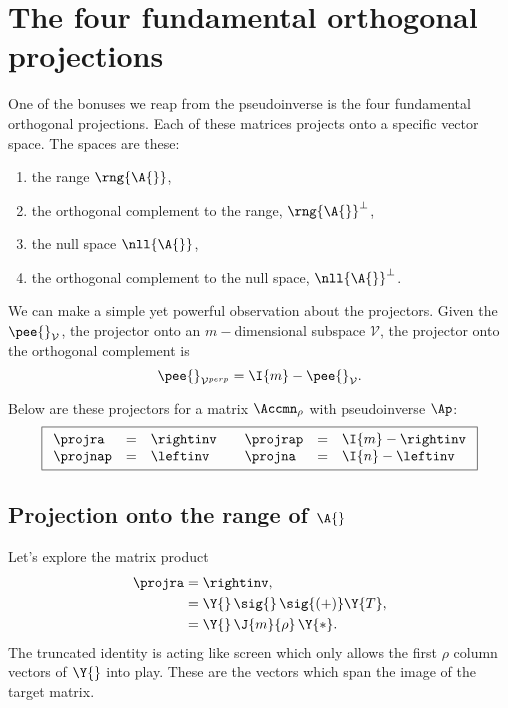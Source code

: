 \section[The fundamental projections]{The four fundamental orthogonal projections}
\label{sec:orthproj}

One of the bonuses we reap from the pseudoinverse is the four fundamental orthogonal projections. Each of these matrices projects onto a specific vector space. The spaces are these:
\begin{enumerate}
\item the range $\rng{\A{}}$,
\item the orthogonal complement to the range, $\rng{\A{}}^{\perp}$,
\item the null space $\nll{\A{}}$,
\item the orthogonal complement to the null space, $\nll{\A{}}^{\perp}$.
\end{enumerate}

We can make a simple yet powerful observation about the projectors.
Given the $\pee{}_{\mathcal{V}}$, the projector onto an $m-$dimensional subspace $\mathcal{V}$, the projector onto the orthogonal complement is
\begin{equation}
  \pee{}_{\mathcal{V}^{perp}} = \I{m}-\pee{}_{\mathcal{V}}.
\end{equation}

Below are these projectors for a matrix $\Accmn_{\rho}$ with pseudoinverse $\Ap$:
\begin{equation}
\boxed{
  \begin{array}{lcllcl}
    \projra& = &\rightinv & \quad \projrap& = &\I{m}-\rightinv\\
    \projnap& =& \leftinv & \quad \projna& = &\I{n}-\leftinv\\    
  \end{array}
  }
  \label{eq:fourprojpi}
\end{equation}

\subsection{Projection onto the range of $\A{}$}
Let's explore the matrix product
\begin{equation}
  \begin{split}
    \projra &= \rightinv,\\
    &= \Y{}\,\sig{}\,\sig{(+)}\Y{T},\\
    & = \Y{}\,\J{m}{\rho}\,\Y{*}.
  \end{split}
\end{equation}
The truncated identity is acting like screen which only allows the first $\rho$ column vectors of $\Y{}$ into play. These are the vectors which span the image of the target matrix.

